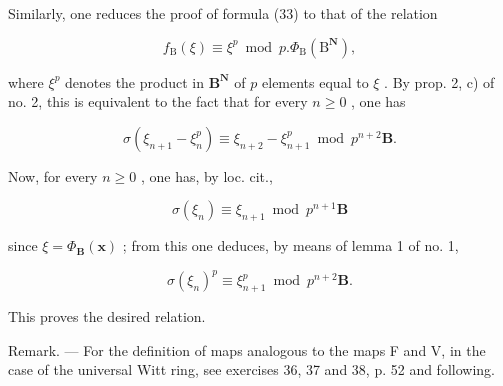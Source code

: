 Similarly, one reduces the proof of formula (33) to that of the relation

\[
f _ {\mathrm{B}} (\xi) \equiv \xi^ {p} \bmod p. \Phi_ {\mathrm{B}} (\mathrm{B} ^ {\mathbf {N}}),
\]

where \(\xi^{p}\) denotes the product in \(\mathbf{B}^{\mathbf{N}}\) of \(p\) elements equal to \(\xi\) . By prop. 2, c) of no. 2, this is equivalent to the fact that for every \(n \geqslant 0\) , one has

\[
\sigma \left(\xi_ {n + 1} - \xi_ {n} ^ {p}\right) \equiv \xi_ {n + 2} - \xi_ {n + 1} ^ {p} \bmod p ^ {n + 2} \mathbf {B}.
\]

Now, for every \(n \geqslant 0\) , one has, by loc. cit.,

\[
\sigma (\xi_ {n}) \equiv \xi_ {n + 1} \bmod p ^ {n + 1} \mathbf {B}
\]

since \(\xi = \Phi_{\mathbf{B}}(\boldsymbol{x})\) ; from this one deduces, by means of lemma 1 of no. 1,

\[
\sigma (\xi_ {n}) ^ {p} \equiv \xi_ {n + 1} ^ {p} \bmod p ^ {n + 2} \mathbf {B}.
\]

This proves the desired relation.

Remark. --- For the definition of maps analogous to the maps F and V, in the case of the universal Witt ring, see exercises 36, 37 and 38, p. 52 and following.

